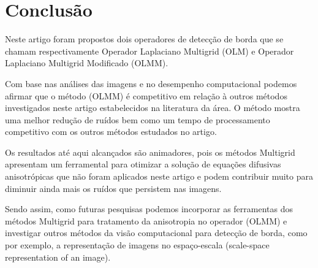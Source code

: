 \documentclass[a4paper]{article} %
\begin{document}
\section{Conclusão}

Neste artigo foram propostos dois operadores de detecção de borda que se chamam respectivamente Operador Laplaciano Multigrid (OLM) e Operador Laplaciano Multigrid Modificado (OLMM).

Com base nas análises das imagens e no desempenho computacional podemos afirmar que o método (OLMM) é competitivo em relação à outros métodos investigados neste artigo estabelecidos na literatura da área. O método mostra uma melhor redução de ruídos bem como um tempo de processamento competitivo com  os outros métodos estudados no artigo. 

Os resultados até aqui alcançados são animadores, pois os métodos Multigrid apresentam um ferramental para otimizar a solução de equações difusivas anisotrópicas que não foram aplicados neste artigo e podem contribuir muito para diminuir ainda mais os ruídos que persistem nas imagens.

Sendo assim, como futuras pesquisas podemos incorporar as ferramentas dos métodos Multigrid para tratamento da anisotropia no operador (OLMM) e investigar outros métodos da visão computacional para detecção de borda, como por exemplo, a representação de imagens no espaço-escala (scale-space representation of an image). 


\end{document}
